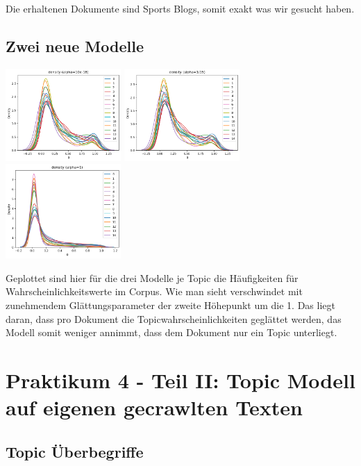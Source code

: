 \noindent Die erhaltenen Dokumente sind Sports Blogs, somit exakt was wir gesucht haben.

\subsection{Zwei neue Modelle}

\includegraphics[width=0.33\textwidth]{images/alpha=10e-18.png}
\includegraphics[width=0.33\textwidth]{images/alpha=0.066.png}
\includegraphics[width=0.33\textwidth]{images/alpha=1.png}

\noindent Geplottet sind hier für die drei Modelle je Topic die Häufigkeiten für Wahrscheinlichkeitswerte im Corpus. Wie man sieht verschwindet mit zunehmendem Glättungsparameter der zweite Höhepunkt um die 1. Das liegt daran, dass pro Dokument die Topicwahrscheinlichkeiten geglättet werden, das Modell somit weniger annimmt, dass dem Dokument nur ein Topic unterliegt.

\setcounter{section}{3}
\section{Praktikum 4 - Teil II: Topic Modell auf eigenen gecrawlten Texten}

\subsection{Topic Überbegriffe}

